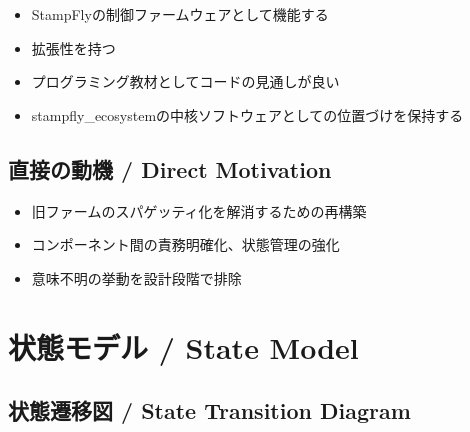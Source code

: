 \documentclass[a4paper,11pt]{article}
\begin{document}
\begin{itemize}[leftmargin=*, itemsep=2pt]
    \item StampFlyの制御ファームウェアとして機能する
    \item 拡張性を持つ
    \item プログラミング教材としてコードの見通しが良い
    \item stampfly\_ecosystemの中核ソフトウェアとしての位置づけを保持する
\end{itemize}

\subsection{直接の動機 / Direct Motivation}

\begin{itemize}[leftmargin=*, itemsep=2pt]
    \item 旧ファームのスパゲッティ化を解消するための再構築
    \item コンポーネント間の責務明確化、状態管理の強化
    \item 意味不明の挙動を設計段階で排除
\end{itemize}

\section{状態モデル / State Model}

\subsection{状態遷移図 / State Transition Diagram}
\end{document}
